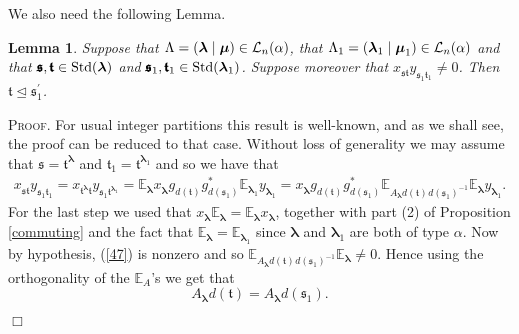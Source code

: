 \documentclass[10pt,a4,twoside,hidelinks,rm]{article}
\newcommand{\bT}{\pmb{\mathfrak{t}}}
\newcommand{\Bs}{\pmb{\mathfrak{s}}}
\newcommand{\std}{{\rm Std}}
\newcommand\blambda{{\boldsymbol\lambda}}
\newcommand\be{\mathbb{E}}
\newcommand\bmu{{\boldsymbol\mu}}
\theoremstyle{plain}
\newtheorem{lem}[teo]{Lemma}
\newenvironment{demo}
{\textsc{Proof.}} {\quad \hfill $\Box$}
\begin{document}
We also need the following Lemma. 
\begin{lem}{\label{firstduality}}
  Suppose that $ \Lambda =(\blambda \mid \bmu )   \in {\cal L}_n(\alpha)  $, that $  \Lambda_1 =
(\blambda_1 \mid \bmu_1 ) 
  \in {\cal L}_n(\alpha)$ and 
that $ \Bs, \bT \in \std(\blambda) $ and $ \Bs_1, \bT_1 \in \std(\blambda_1) $.
Suppose moreover that 
$  x_{\Bs\bT} y_{ \Bs_1 \bT_1     } \neq 0 $.  Then $ \bT \unlhd \Bs_1^{\prime}          $.
\end{lem}
\begin{demo}
  For usual integer partitions this result is well-known, and as we shall see, the proof can be
  reduced to that case. 
Without loss of generality we may assume that $ \Bs = \bT^{\blambda} $ and
$ \bT_1 = \bT^{\blambda_1} $ and so we have that 
\begin{equation}\label{47}
\begin{array}{lr}
 x^{}_{\Bs\bT} y^{}_{ \Bs_1 \bT_1     } = 
 x_{\bT^{\blambda}  \bT} y_{  \Bs_1   \bT^{\blambda_1} } = \be^{}_{\blambda} x^{}_{\blambda} g^{}_{d(\bT)}
 g_{d( \Bs_1)}^{\ast}  \be^{}_{\blambda_1}   y^{}_{\blambda_1}
=  x^{}_{\blambda} g^{}_{d(\bT)} 
g_{d( \Bs_1)}^{\ast}    \be^{}_{A_{\blambda} d(\bT)^{} d( \Bs_1)^{-1}  }  \be^{}_{{\blambda}}
y^{}_{\blambda_1}. 
\end{array}
\end{equation}
For the last step
we used that $ x^{}_{\blambda} \be^{}_{{\blambda}} = \be^{}_{{\blambda}}  x^{}_{\blambda} $,
together with part (2) of Proposition \ref{commuting} 
and the fact that $ \be^{}_{{\blambda}} = \be^{}_{{\blambda_1}} $ since
$ \blambda $ and $ \blambda_1 $ are both of type $ \alpha$.
Now by hypothesis,  (\ref{47}) is nonzero and so 
$   \be_{A_{\blambda} d(\bT)^{} d( {\Bs_1})^{-1}  }  \be_{\blambda} \neq 0 $.  Hence using
the orthogonality of the $ \be_A$'s we get that 
\begin{equation}\label{andsoon} A_{\blambda} d(\bT) = A_{\blambda} d({\Bs}_1).
\end{equation}
  

\end{demo}
\end{document}
